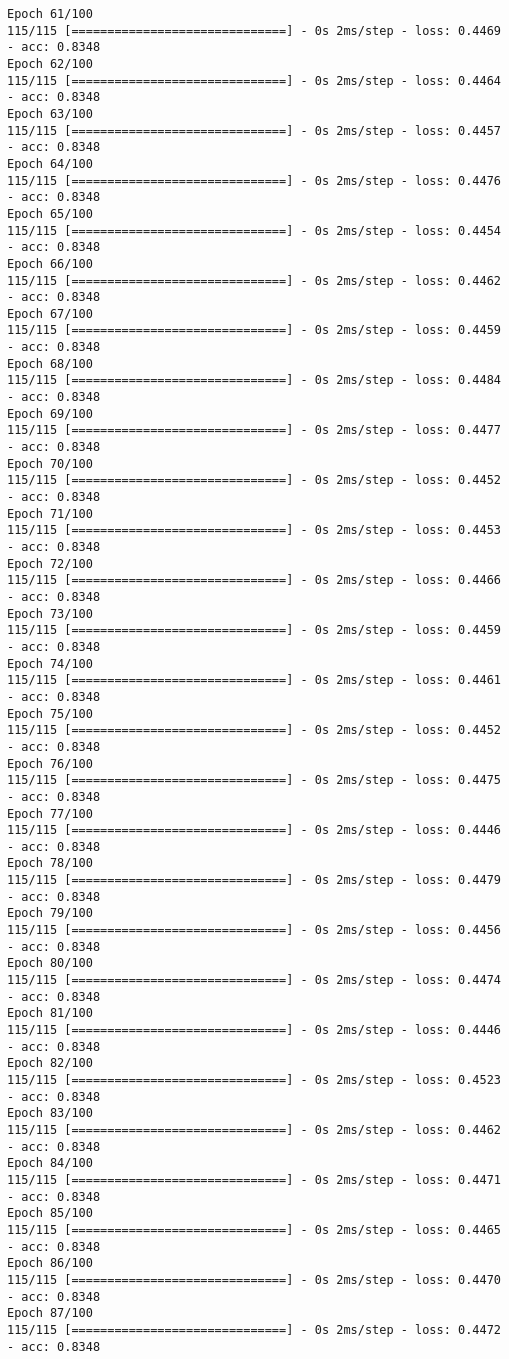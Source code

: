 \documentclass[11pt]{article}
\begin{document}
\begin{Verbatim}[commandchars=\\\{\}]
Epoch 61/100
115/115 [==============================] - 0s 2ms/step - loss: 0.4469 - acc: 0.8348
Epoch 62/100
115/115 [==============================] - 0s 2ms/step - loss: 0.4464 - acc: 0.8348
Epoch 63/100
115/115 [==============================] - 0s 2ms/step - loss: 0.4457 - acc: 0.8348
Epoch 64/100
115/115 [==============================] - 0s 2ms/step - loss: 0.4476 - acc: 0.8348
Epoch 65/100
115/115 [==============================] - 0s 2ms/step - loss: 0.4454 - acc: 0.8348
Epoch 66/100
115/115 [==============================] - 0s 2ms/step - loss: 0.4462 - acc: 0.8348
Epoch 67/100
115/115 [==============================] - 0s 2ms/step - loss: 0.4459 - acc: 0.8348
Epoch 68/100
115/115 [==============================] - 0s 2ms/step - loss: 0.4484 - acc: 0.8348
Epoch 69/100
115/115 [==============================] - 0s 2ms/step - loss: 0.4477 - acc: 0.8348
Epoch 70/100
115/115 [==============================] - 0s 2ms/step - loss: 0.4452 - acc: 0.8348
Epoch 71/100
115/115 [==============================] - 0s 2ms/step - loss: 0.4453 - acc: 0.8348
Epoch 72/100
115/115 [==============================] - 0s 2ms/step - loss: 0.4466 - acc: 0.8348
Epoch 73/100
115/115 [==============================] - 0s 2ms/step - loss: 0.4459 - acc: 0.8348
Epoch 74/100
115/115 [==============================] - 0s 2ms/step - loss: 0.4461 - acc: 0.8348
Epoch 75/100
115/115 [==============================] - 0s 2ms/step - loss: 0.4452 - acc: 0.8348
Epoch 76/100
115/115 [==============================] - 0s 2ms/step - loss: 0.4475 - acc: 0.8348
Epoch 77/100
115/115 [==============================] - 0s 2ms/step - loss: 0.4446 - acc: 0.8348
Epoch 78/100
115/115 [==============================] - 0s 2ms/step - loss: 0.4479 - acc: 0.8348
Epoch 79/100
115/115 [==============================] - 0s 2ms/step - loss: 0.4456 - acc: 0.8348
Epoch 80/100
115/115 [==============================] - 0s 2ms/step - loss: 0.4474 - acc: 0.8348
Epoch 81/100
115/115 [==============================] - 0s 2ms/step - loss: 0.4446 - acc: 0.8348
Epoch 82/100
115/115 [==============================] - 0s 2ms/step - loss: 0.4523 - acc: 0.8348
Epoch 83/100
115/115 [==============================] - 0s 2ms/step - loss: 0.4462 - acc: 0.8348
Epoch 84/100
115/115 [==============================] - 0s 2ms/step - loss: 0.4471 - acc: 0.8348
Epoch 85/100
115/115 [==============================] - 0s 2ms/step - loss: 0.4465 - acc: 0.8348
Epoch 86/100
115/115 [==============================] - 0s 2ms/step - loss: 0.4470 - acc: 0.8348
Epoch 87/100
115/115 [==============================] - 0s 2ms/step - loss: 0.4472 - acc: 0.8348

\end{Verbatim}
\end{document}

